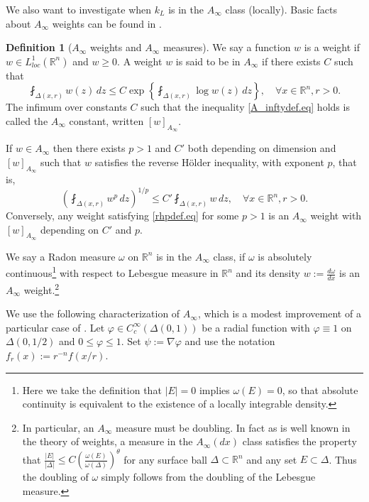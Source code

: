 \documentclass[11pt, a4paper,leqno]{amsart}
\theoremstyle{plain}
\theoremstyle{definition}
\newtheorem{definition}[equation]{Definition}
\theoremstyle{remark}
\numberwithin{equation}{section}
\newcommand{\rn}{\mathbb{R}^n}
\begin{document}
We also want to investigate when $k_L$ is in the $A_\infty$ class (locally). Basic facts about $A_\infty$ weights can be found in \cite{GCRDF}.

\begin{definition}[$A_\infty$ weights and $A_\infty$ measures]\label{Ainfty.def}
We say a function $w$ is a weight if  $w \in L^1_{loc}(\rn)$ and  $w \ge 0$. 
A weight $w$ is said to be in $A_\infty$ if there exists $C$ such that
\begin{equation}\label{A_inftydef.eq}
\fint_{\Delta(x,r)} w(z) \, dz \le C\exp\left\{\fint_{\Delta(x,r)} \log w(z) \, dz\right\}, \quad \forall x \in \rn, r > 0.
\end{equation}
The infimum over constants $C$ such that the inequality \eqref{A_inftydef.eq} holds is called the $A_\infty$ constant, written $[w]_{A_\infty}$.

If $w \in A_\infty$ then there exists $p > 1$ and $C'$ both depending on dimension and $[w]_{A_\infty}$ such that $w$ satisfies the reverse H\"older inequality, with exponent $p$, that is,
\begin{equation}\label{rhpdef.eq}
\left(\fint_{\Delta(x,r)} w^p \, dz \right)^{1/p} \le C' \fint_{\Delta(x,r)} w \, dz, \quad \forall x \in \rn, r > 0.
\end{equation}
Conversely, any weight satisfying \eqref{rhpdef.eq} for some $p > 1$ is an $A_\infty$ weight with $[w]_{A_\infty}$ depending on $C'$ and $p$. 

 
We say a Radon measure $\omega$ on $\mathbb{R}^n$ is in the $A_\infty$ class, if $\omega$ is absolutely continuous\footnote{Here we take the definition that $|E| = 0$ implies $\omega(E) =0$, so that absolute continuity is equivalent to the existence of a locally integrable density.} with respect to Lebesgue measure in $\mathbb{R}^n$ and its density $w := \tfrac{d\omega}{dx}$ is an $A_\infty$ weight.\footnote{In particular, an $A_\infty$ measure must be doubling. In fact as is well known in the theory of weights, a measure in the $A_\infty(dx)$ class satisfies the property that $\frac{|E|}{|\Delta|} \leq C \left(\frac{\omega(E)}{\omega(\Delta)} \right)^{\theta}$ for any surface ball $\Delta \subset \mathbb{R}^n$ and any set $E \subset \Delta$. Thus the doubling of $\omega$ simply follows from the doubling of the Lebesgue measure.}
\end{definition}

We use the following characterization of $A_\infty$, which is a modest improvement of a particular case of \cite[Theorem 3.1]{FKP}. Let $\varphi \in C^\infty_c(\Delta(0,1))$ be a radial function with $\varphi \equiv 1$ on $\Delta(0,1/2)$ and $0 \le \varphi \le 1$. Set $\psi := \nabla \varphi$ and use the notation $f_r(x) := r^{-n} f(x/r)$.
\end{document}
